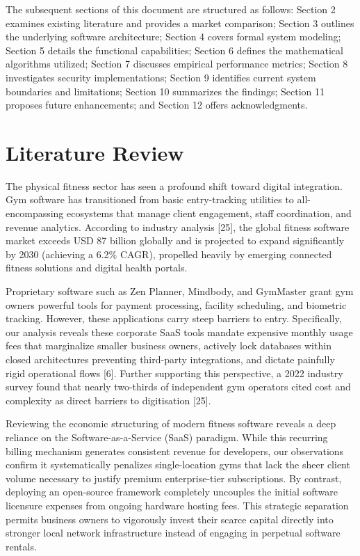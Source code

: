 The subsequent sections of this document are structured as follows:
Section 2 examines existing literature and provides a market comparison;
Section 3 outlines the underlying software architecture; Section 4
covers formal system modeling; Section 5 details the functional
capabilities; Section 6 defines the mathematical algorithms utilized;
Section 7 discusses empirical performance metrics; Section 8
investigates security implementations; Section 9 identifies current
system boundaries and limitations; Section 10 summarizes the findings;
Section 11 proposes future enhancements; and Section 12 offers
acknowledgments.

\section{Literature Review}\label{literature-review}

The physical fitness sector has seen a profound shift toward digital
integration. Gym software has transitioned from basic entry-tracking
utilities to all-encompassing ecosystems that manage client engagement,
staff coordination, and revenue analytics. According to industry
analysis {[}25{]}, the global fitness software market exceeds USD 87
billion globally and is projected to expand significantly by 2030
(achieving a 6.2\% CAGR), propelled heavily by emerging connected
fitness solutions and digital health portals.

Proprietary software such as Zen Planner, Mindbody, and GymMaster grant
gym owners powerful tools for payment processing, facility scheduling,
and biometric tracking. However, these applications carry steep barriers
to entry. Specifically, our analysis reveals these corporate SaaS tools
mandate expensive monthly usage fees that marginalize smaller business
owners, actively lock databases within closed architectures preventing
third-party integrations, and dictate painfully rigid operational flows
{[}6{]}. Further supporting this perspective, a 2022 industry survey
found that nearly two-thirds of independent gym operators cited cost and
complexity as direct barriers to digitisation {[}25{]}.

Reviewing the economic structuring of modern fitness software reveals a
deep reliance on the Software-as-a-Service (SaaS) paradigm. While this
recurring billing mechanism generates consistent revenue for developers,
our observations confirm it systematically penalizes single-location
gyms that lack the sheer client volume necessary to justify premium
enterprise-tier subscriptions. By contrast, deploying an open-source
framework completely uncouples the initial software licensure expenses
from ongoing hardware hosting fees. This strategic separation permits
business owners to vigorously invest their scarce capital directly into
stronger local network infrastructure instead of engaging in perpetual
software rentals.

